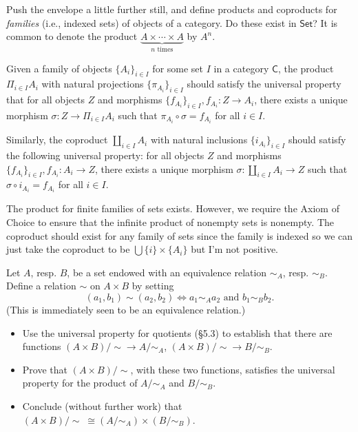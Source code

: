 \documentclass[../../master.tex]{subfiles}
\begin{document}
    \begin{problem}
      Push the envelope a little further still, and define products and coproducts for \textit{families} (i.e., indexed sets) of objects of a category.
      Do these exist in \(\mathsf{Set}\)?
      It is common to denote the product \(\underbrace{A \times \cdots \times A}_{n \text{ times}}\) by \(A^{n}\).
    \end{problem}

    \begin{solution}
      Given a family of objects \(\{A_{i}\}_{i \in I}\) for some set \(I\) in a category \(\mathsf{C}\),
      the product \(\Pi_{i \in I} A_{i}\) with natural projections \(\{\pi_{A_{i}}\}_{i \in I}\) should satisfy the universal property that
      for all objects \(Z\) and morphisms \(\{f_{A_{i}}\}_{i \in I}, f_{A_{i}}: Z \to A_{i}\), there exists a unique morphism
      \(\sigma: Z \to \Pi_{i \in I} A_{i}\) such that \(\pi_{A_{i}} \circ \sigma = f_{A_{i}}\) for all \(i \in I\).

      Similarly, the coproduct \(\coprod_{i \in I} A_{i}\) with natural inclusions \(\{i_{A_{i}}\}_{i \in I}\) should satisfy the following universal property:
      for all objects \(Z\) and morphisms \(\{f_{A_{i}}\}_{i \in I}, f_{A_{i}}: A_{i} \to Z\), there exists a unique morphism
      \(\sigma: \coprod_{i \in I} A_{i} \to Z\) such that \(\sigma \circ i_{A_{i}} = f_{A_{i}}\) for all \(i \in I\).

      The product for finite families of sets exists.
      However, we require the Axiom of Choice to ensure that the infinite product of nonempty sets is nonempty.
      The coproduct should exist for any family of sets since the family is indexed so we can just take the coproduct to be \(\bigcup \{i\} \times \{A_{i}\}\) but I'm not positive.
    \end{solution}

    \begin{problem}
      Let \(A\), resp. \(B\), be a set endowed with an equivalence relation \(\sim_{A}\), resp. \(\sim_{B}\).
      Define a relation \(\sim\) on \(A \times B\) by setting
      \begin{equation*}
        (a_{1}, b_{1}) \sim (a_{2}, b_{2}) \Longleftrightarrow a_{1} \sim_{A} a_{2} \text{ and } b_{1} \sim_{B} b_{2}.
      \end{equation*}
      (This is immediately seen to be an equivalence relation.)
      \begin{itemize}
        \item Use the universal property for quotients (\S 5.3) to establish that there are functions
        \((A \times B) / {\sim} \to A / {\sim_{A}}\), \((A \times B) / {\sim} \to B / {\sim_{B}}\).
        \item Prove that \((A \times B) / {\sim}\), with these two functions, satisfies the universal property for the product of
        \(A / {\sim_{A}}\) and \(B / {\sim_{B}}\).
        \item Conclude (without further work) that \((A \times B) / {\sim} \; \cong (A / {\sim_{A}}) \times (B / {\sim_{B}})\).
      \end{itemize}
    \end{problem}
\end{document}
